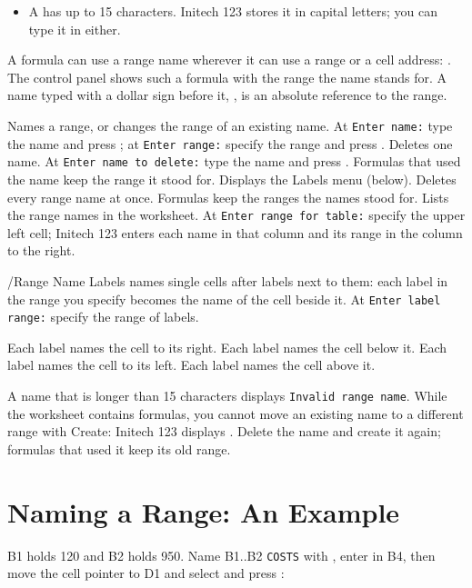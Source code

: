 \begin{itemize}
\item A  has up to 15 characters.  Initech 123 stores it
  in capital letters; you can type it in either.
\end{itemize}
A formula can use a range name wherever it can use a range or a cell
address: .  The control panel shows such a formula with
the range the name stands for.  A name typed with a dollar sign before it,
, is an absolute reference to the range.

\begin{Options}
 Names a range, or changes the range of an existing name.
  At \texttt{Enter name:} type the name and press ; at
  \texttt{Enter range:} specify the range and press .
 Deletes one name.  At \texttt{Enter name to delete:} type
  the name and press .  Formulas that used the name keep the
  range it stood for.
 Displays the Labels menu (below).
 Deletes every range name at once.  Formulas keep the ranges
  the names stood for.
 Lists the range names in the worksheet.  At
  \texttt{Enter range for table:} specify the upper left cell; Initech 123
  enters each name in that column and its range in the column to the
  right.
\end{Options}

/Range Name Labels names single cells after labels next to them: each
label in the range you specify becomes the name of the cell beside it.  At
\texttt{Enter label range:} specify the range of labels.
\begin{Options}
 Each label names the cell to its right.
 Each label names the cell below it.
 Each label names the cell to its left.
 Each label names the cell above it.
\end{Options}

\begin{Note}
A name that is longer than 15 characters displays \texttt{Invalid range
name}.  While the worksheet contains formulas, you cannot move an existing
name to a different range with Create: Initech 123 displays
.  Delete the name and create it again; formulas
that used it keep its old range.
\end{Note}

\section{Naming a Range: An Example}
B1 holds 120 and B2 holds 950.  Name B1..B2 \texttt{COSTS} with
, enter  in B4, then move the
cell pointer to D1 and select  and press
:


